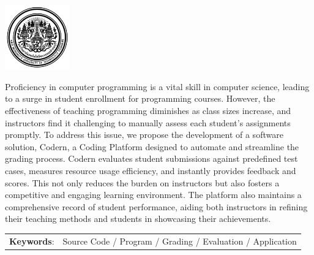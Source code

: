 \documentclass[12pt,oneside,openright,a4paper]{cpe-thai-project}
\begin{document}
\pdfstringdefDisableCommands{%
\let\MakeUppercase\relax
}

\begin{center}
  \includegraphics[width=2.8cm]{./figure/logo02.jpg}
\end{center}
\vspace*{-1cm}

\maketitlepage
\makesignaturepage 

\abstract
Proficiency in computer programming is a vital skill in computer science, leading to a surge in student enrollment for programming courses. However, the effectiveness of teaching programming diminishes as class sizes increase, and instructors find it challenging to manually assess each student's assignments promptly. To address this issue, we propose the development of a software solution, Codern, a Coding Platform designed to automate and streamline the grading process. Codern evaluates student submissions against predefined test cases, measures resource usage efficiency, and instantly provides feedback and scores. This not only reduces the burden on instructors but also fosters a competitive and engaging learning environment. The platform also maintains a comprehensive record of student performance, aiding both instructors in refining their teaching methods and students in showcasing their achievements.

\begin{flushleft}
\begin{tabular*}{\textwidth}{@{}lp{}}
\textbf{Keywords}: & Source Code / Program / Grading / Evaluation / Application
\end{tabular*}
\end{flushleft}
\endabstract
\end{document}
